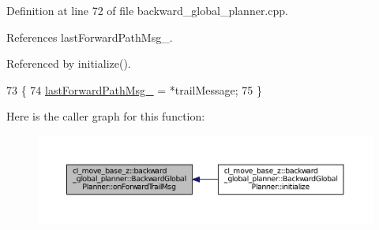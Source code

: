 Definition at line 72 of file backward\+\_\+global\+\_\+planner.\+cpp.



References last\+Forward\+Path\+Msg\+\_\+.



Referenced by initialize().


\begin{DoxyCode}
73 \{
74     \hyperlink{classcl__move__base__z_1_1backward__global__planner_1_1BackwardGlobalPlanner_a149ee7d22d98271c9ee1da55241d500b}{lastForwardPathMsg\_} = *trailMessage;
75 \}
\end{DoxyCode}


Here is the caller graph for this function\+:
\nopagebreak
\begin{figure}[H]
\begin{center}
\leavevmode
\includegraphics[width=350pt]{classcl__move__base__z_1_1backward__global__planner_1_1BackwardGlobalPlanner_a515bde5bfb3ae548f3e19209df1a48b0_icgraph}
\end{center}
\end{figure}


